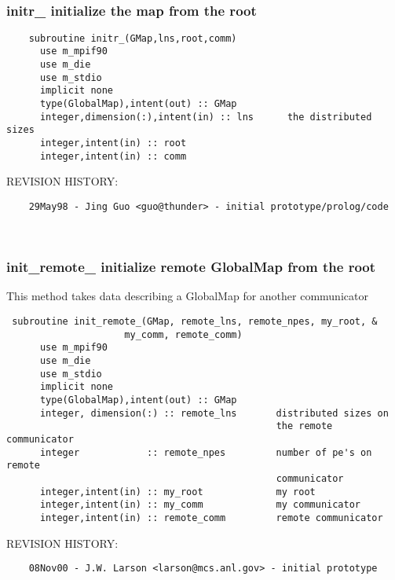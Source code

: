  
\mbox{}\hrulefill\ 
 

 \subsubsection{initr\_ initialize the map from the root}


 
 
\begin{verbatim} 
    subroutine initr_(GMap,lns,root,comm)
      use m_mpif90
      use m_die
      use m_stdio
      implicit none
      type(GlobalMap),intent(out) :: GMap
      integer,dimension(:),intent(in) :: lns	  the distributed sizes
      integer,intent(in) :: root
      integer,intent(in) :: comm
 \end{verbatim}{\sf REVISION HISTORY:}
\begin{verbatim}  	29May98 - Jing Guo <guo@thunder> - initial prototype/prolog/code\end{verbatim}
 
 
\mbox{}\hrulefill\ 
 

 \subsubsection{init\_remote\_ initialize remote GlobalMap from the root}


 
  This method takes data describing a GlobalMap for another communicator
 
\begin{verbatim} 
 subroutine init_remote_(GMap, remote_lns, remote_npes, my_root, &
                     my_comm, remote_comm)
      use m_mpif90
      use m_die
      use m_stdio
      implicit none
      type(GlobalMap),intent(out) :: GMap
      integer, dimension(:) :: remote_lns       distributed sizes on 
                                                the remote communicator
      integer            :: remote_npes         number of pe's on remote 
                                                communicator
      integer,intent(in) :: my_root             my root
      integer,intent(in) :: my_comm             my communicator
      integer,intent(in) :: remote_comm         remote communicator
 \end{verbatim}{\sf REVISION HISTORY:}
\begin{verbatim}  	08Nov00 - J.W. Larson <larson@mcs.anl.gov> - initial prototype\end{verbatim}
 
